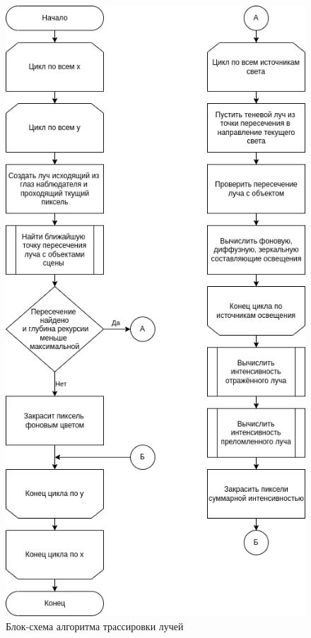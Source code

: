 \begin{figure}[hbtp]
	\centering
	\includegraphics[scale=0.65]{img/trace_diag.png}
	\caption{Блок-схема алгоритма трассировки лучей}
\end{figure}

